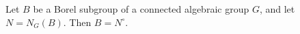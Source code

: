 Let $B$ be a Borel subgroup of a connected algebraic group $G$, and let $N = N_G(B)$. Then $B = N^\circ$.
